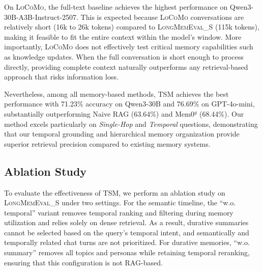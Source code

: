 \documentclass[11pt]{article}
\newcommand{\ours}[1]{TSM}
\begin{document}
 On \textsc{LoCoMo}, the full-text baseline achieves the highest performance on Qwen3-30B-A3B-Instruct-2507. This is expected because \textsc{LoCoMo} conversations are relatively short (16k to 26k tokens) compared to \textsc{LongMemEval\_S} (115k tokens), making it feasible to fit the entire context within the model's window. More importantly, \textsc{LoCoMo} does not effectively test critical memory capabilities such as knowledge updates. When the full conversation is short enough to process directly, providing complete context naturally outperforms any retrieval-based approach that risks information loss.

Nevertheless, among all memory-based methods, \ours{} achieves the best performance with 71.23\% accuracy on Qwen3-30B and 76.69\% on GPT-4o-mini, substantially outperforming Naive RAG (63.64\%) and Mem0$^g$ (68.44\%). Our method excels particularly on \textit{Single-Hop} and \textit{Temporal} questions, demonstrating that our temporal grounding and hierarchical memory organization provide superior retrieval precision compared to existing memory systems.




\subsection{Ablation Study}
To evaluate the effectiveness of \ours{}, we perform an ablation study on \textsc{LongMemEval\_S} under two settings. For the semantic timeline, the ``w.o. temporal'' variant removes temporal ranking and filtering during memory utilization and relies solely on dense retrieval. As a result, durative summaries cannot be selected based on the query's temporal intent, and semantically and temporally related chat turns are not prioritized. For durative memories, ``w.o. summary'' removes all topics and personas while retaining temporal reranking, ensuring that this configuration is not RAG-based.
\end{document}
